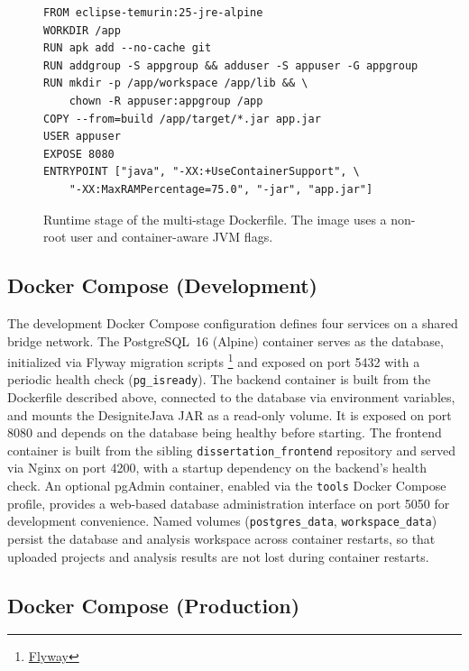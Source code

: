 \begin{figure}[htbp]
    \begin{verbatim}
FROM eclipse-temurin:25-jre-alpine
WORKDIR /app
RUN apk add --no-cache git
RUN addgroup -S appgroup && adduser -S appuser -G appgroup
RUN mkdir -p /app/workspace /app/lib && \
    chown -R appuser:appgroup /app
COPY --from=build /app/target/*.jar app.jar
USER appuser
EXPOSE 8080
ENTRYPOINT ["java", "-XX:+UseContainerSupport", \
    "-XX:MaxRAMPercentage=75.0", "-jar", "app.jar"]
    \end{verbatim}
    \caption{Runtime stage of the multi-stage Dockerfile. The image uses a non-root user and container-aware JVM flags.}
    \label{lst:dockerfile-runtime}
\end{figure}

\subsection{Docker Compose (Development)}
\label{subsec:docker-dev}

\par The development Docker Compose configuration defines four services on a shared bridge network. The PostgreSQL~16 (Alpine) container serves as the database, initialized via Flyway migration scripts \footnote{\href{https://github.com/flyway/flyway}{Flyway}} and exposed on port 5432 with a periodic health check (\texttt{pg\_isready}). The backend container is built from the Dockerfile described above, connected to the database via environment variables, and mounts the DesigniteJava JAR as a read-only volume. It is exposed on port 8080 and depends on the database being healthy before starting. The frontend container is built from the sibling \texttt{dissertation\_frontend} repository and served via Nginx on port 4200, with a startup dependency on the backend's health check. An optional pgAdmin container, enabled via the \texttt{tools} Docker Compose profile, provides a web-based database administration interface on port 5050 for development convenience. Named volumes (\texttt{postgres\_data}, \texttt{workspace\_data}) persist the database and analysis workspace across container restarts, so that uploaded projects and analysis results are not lost during container restarts.

\subsection{Docker Compose (Production)}
\label{subsec:docker-prod}

